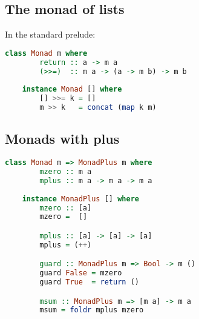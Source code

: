 \documentclass{article}
\begin{document}
\subsection{The monad of lists}
In the standard prelude:
\begin{lstlisting}[language=haskell]
    class Monad m where
        return :: a -> m a
        (>>=)  :: m a -> (a -> m b) -> m b
    
    instance Monad [] where
        [] >>= k = []
        m >> k   = concat (map k m)
\end{lstlisting}
\subsection{Monads with plus}
\begin{lstlisting}[language=haskell]
    class Monad m => MonadPlus m where
        mzero :: m a
        mplus :: m a -> m a -> m a
    
    instance MonadPlus [] where
        mzero :: [a]
        mzero =  []

        mplus :: [a] -> [a] -> [a]
        mplus = (++)

        guard :: MonadPlus m => Bool -> m ()
        guard False = mzero
        guard True  = return ()

        msum :: MonadPlus m => [m a] -> m a
        msum = foldr mplus mzero
\end{lstlisting}
\end{document}
